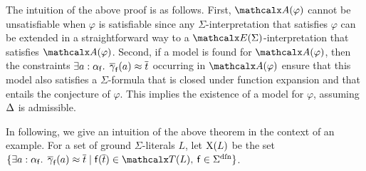 \begin{longv}
The intuition of the above proof is as follows.
First, $\conv( \varphi )$ cannot be unsatisfiable when $\varphi$ is satisfiable
since any $\Sigma$-interpretation that satisfies $\varphi$ can be extended in a straightforward way to 
a $\extendsig{\Sigma}$-interpretation that satisfies $\conv( \varphi )$.
Second, if a model is found for $\conv( \varphi )$,
then the constraints $\exists a : \alpha_{\mathsf{f}}.\;\, \overline{\gamma}_{\mathsf{f}}( a ) \approx \overline{t}$
occurring in $\conv( \varphi )$ ensure that this model also satisfies
a $\Sigma$-formula that is closed under function expansion and
that entails the conjecture of $\varphi$.
This implies the existence of a model for $\varphi$,
assuming $\DDD$ is admissible.
\end{longv}

\begin{shortv}
In following, we give an intuition of the above theorem in the context of an example.
For a set of ground $\Sigma$-literals $L$, let $\mathrm{X}( L )$ be the set
$\{ \exists a : {\fargtype{\con{f}}}.\;\, \vecfarg{\con{f}}( a ) \teq \vec t
\mid \con{f}( \vec t ) \in \terms( L ),\: \con{f} \in \sfundefs{\Sigma}
\}$.
\end{shortv}


